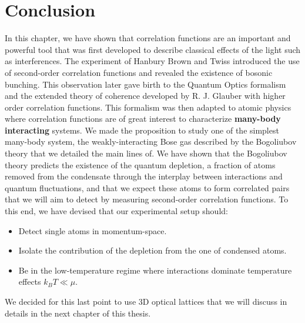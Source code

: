\section{Conclusion}

In this chapter, we have shown that correlation functions are an important and powerful tool that was first developed to describe classical effects of the light such as interferences. The experiment of Hanbury Brown and Twiss introduced the use of second-order correlation functions and revealed the existence of bosonic bunching. This observation later gave birth to the Quantum Optics formalism and the extended theory of coherence developed by R. J. Glauber with higher order correlation functions. This formalism was then adapted to atomic physics where correlation functions are of great interest to characterize \textbf{many-body interacting} systems. We made the proposition to study one of the simplest many-body system, the weakly-interacting Bose gas described by the Bogoliubov theory that we detailed the main lines of. We have shown that the Bogoliubov theory predicts the existence of the quantum depletion, a fraction of atoms removed from the condensate through the interplay between interactions and quantum fluctuations, and that we expect these atoms to form \kmk correlated pairs that we will aim to detect by measuring second-order correlation functions. To this end, we have devised that our experimental setup should:

\begin{itemize}
    \item Detect single atoms in momentum-space.
    \item Isolate the contribution of the depletion from the one of condensed atoms.
    \item Be in the low-temperature regime where interactions dominate temperature effects $k_B T \ll \mu $. 
\end{itemize}

We decided for this last point to use 3D optical lattices that we will discuss in details in the next chapter of this thesis.